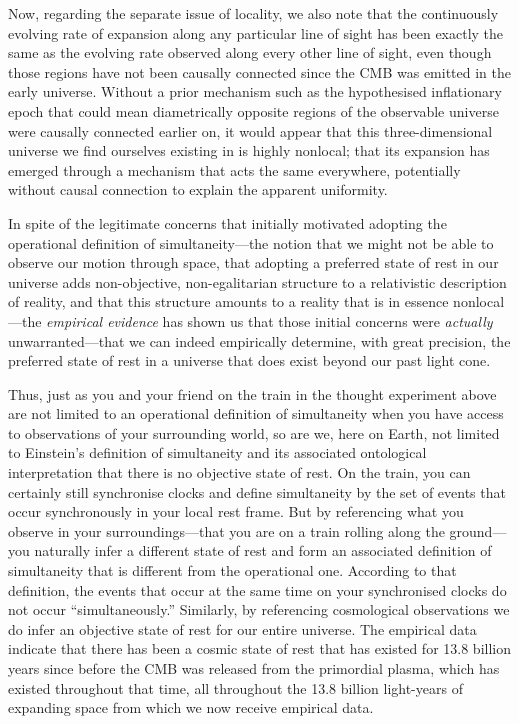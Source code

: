 \documentclass[aps,rmp,groupedaddress,twocolumn,10pt]{revtex4-2}
\begin{document}
Now, regarding the separate issue of locality, we also note that the continuously evolving rate of expansion along any particular line of sight has been exactly the same as the evolving rate observed along every other line of sight, even though those regions have not been causally connected since the CMB was emitted in the early universe. Without a prior mechanism such as the hypothesised inflationary epoch \cite{Guth1981} that could mean diametrically opposite regions of the observable universe were causally connected earlier on, it would appear that this three-dimensional universe we find ourselves existing in is highly nonlocal; that its expansion has emerged through a mechanism that acts the same everywhere, potentially without causal connection to explain the apparent uniformity. 

In spite of the legitimate concerns that initially motivated adopting the operational definition of simultaneity---the notion that we might not be able to observe our motion through space, that adopting a preferred state of rest in our universe adds non-objective, non-egalitarian structure to a relativistic description of reality, and that this structure amounts to a reality that is in essence nonlocal---the \textit{empirical evidence} has shown us that those initial concerns were \textit{actually} unwarranted---that we can indeed empirically determine, with great precision, the preferred state of rest in a universe that does exist beyond our past light cone. 

Thus, just as you and your friend on the train in the thought experiment above are not limited to an operational definition of simultaneity when you have access to observations of your surrounding world, so are we, here on Earth, not limited to Einstein's definition of simultaneity and its associated ontological interpretation that there is no objective state of rest. On the train, you can certainly still synchronise clocks and define simultaneity by the set of events that occur synchronously in your local rest frame. But by referencing what you observe in your surroundings---that you are on a train rolling along the ground---you naturally infer a different state of rest and form an associated definition of simultaneity that is different from the operational one. According to that definition, the events that occur at the same time on your synchronised clocks do not occur ``simultaneously.'' Similarly, by referencing cosmological observations we do infer an objective state of rest for our entire universe. The empirical data indicate that there has been a cosmic state of rest that has existed for 13.8 billion years since before the CMB was released from the primordial plasma, which has existed throughout that time, all throughout the 13.8 billion light-years of expanding space from which we now receive empirical data. 
\end{document}
